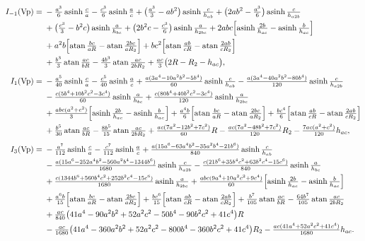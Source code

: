 \documentclass[11pt]{article}
\theoremstyle{remark}
\newcommand{\asinh}{\operatorname{asinh}}
\newcommand{\atan}{\operatorname{atan}}
\begin{document}
{\small
\begin{align}
I_{-1}(\text{Vp}) ={}& -\tfrac{a^3}{6}\asinh\tfrac{c}{a} - \tfrac{c^3}{6}\asinh\tfrac{a}{c}
 + \bigl(\tfrac{a^3}{3} - ab^2\bigr)\asinh\tfrac{c}{h_{ab}}
 + \bigl(2ab^2 - \tfrac{a^3}{6}\bigr)\asinh\tfrac{c}{h_{a2b}}\notag\\
&+ \bigl(\tfrac{c^3}{3} - b^2c\bigr)\asinh\tfrac{a}{h_{bc}}
 + \bigl(2b^2c - \tfrac{c^3}{6}\bigr)\asinh\tfrac{a}{h_{2bc}}
 + 2abc\Bigl[\asinh\tfrac{2b}{h_{ac}} - \asinh\tfrac{b}{h_{ac}}\Bigr]\notag\\
&+ a^2b\Bigl[\atan\tfrac{bc}{aR} - \atan\tfrac{2bc}{aR_2}\Bigr]
 + bc^2\Bigl[\atan\tfrac{ab}{cR} - \atan\tfrac{2ab}{cR_2}\Bigr]\notag\\
&+ \tfrac{b^3}{3}\atan\tfrac{ac}{bR} - \tfrac{4b^3}{3}\atan\tfrac{ac}{2bR_2}
 + \tfrac{ac}{3}\bigl(2R - R_2 - h_{ac}\bigr),
\label{eq:vpm1}\\[4pt]
I_{1}(\text{Vp}) ={}& -\tfrac{a^5}{40}\asinh\tfrac{c}{a} - \tfrac{c^5}{40}\asinh\tfrac{a}{c}
 + \tfrac{a(3a^4-10a^2b^2-5b^4)}{60}\asinh\tfrac{c}{h_{ab}}
 - \tfrac{a(3a^4-40a^2b^2-80b^4)}{120}\asinh\tfrac{c}{h_{a2b}}\notag\\
&- \tfrac{c(5b^4+10b^2c^2-3c^4)}{60}\asinh\tfrac{a}{h_{bc}}
 + \tfrac{c(80b^4+40b^2c^2-3c^4)}{120}\asinh\tfrac{a}{h_{2bc}}\notag\\
&+ \tfrac{abc(a^2+c^2)}{3}\Bigl[\asinh\tfrac{2b}{h_{ac}} - \asinh\tfrac{b}{h_{ac}}\Bigr]
 + \tfrac{a^4b}{6}\Bigl[\atan\tfrac{bc}{aR} - \atan\tfrac{2bc}{aR_2}\Bigr]
 + \tfrac{bc^4}{6}\Bigl[\atan\tfrac{ab}{cR} - \atan\tfrac{2ab}{cR_2}\Bigr]\notag\\
&+ \tfrac{b^5}{30}\atan\tfrac{ac}{bR} - \tfrac{8b^5}{15}\atan\tfrac{ac}{2bR_2}
 + \tfrac{ac(7a^2-12b^2+7c^2)}{60}R - \tfrac{ac(7a^2-48b^2+7c^2)}{120}R_2
 - \tfrac{7ac(a^2+c^2)}{120}h_{ac},\\[4pt]
I_{3}(\text{Vp}) ={}& -\tfrac{a^7}{112}\asinh\tfrac{c}{a} - \tfrac{c^7}{112}\asinh\tfrac{a}{c}
 + \tfrac{a(15a^6-63a^4b^2-35a^2b^4-21b^6)}{840}\asinh\tfrac{c}{h_{ab}}\notag\\
&- \tfrac{a(15a^6-252a^4b^2-560a^2b^4-1344b^6)}{1680}\asinh\tfrac{c}{h_{a2b}}
 - \tfrac{c(21b^6+35b^4c^2+63b^2c^4-15c^6)}{840}\asinh\tfrac{a}{h_{bc}}\notag\\
&+ \tfrac{c(1344b^6+560b^4c^2+252b^2c^4-15c^6)}{1680}\asinh\tfrac{a}{h_{2bc}}
 + \tfrac{abc(9a^4+10a^2c^2+9c^4)}{60}\Bigl[\asinh\tfrac{2b}{h_{ac}} - \asinh\tfrac{b}{h_{ac}}\Bigr]\notag\\
&+ \tfrac{a^6b}{15}\Bigl[\atan\tfrac{bc}{aR} - \atan\tfrac{2bc}{aR_2}\Bigr]
 + \tfrac{bc^6}{15}\Bigl[\atan\tfrac{ab}{cR} - \atan\tfrac{2ab}{cR_2}\Bigr]
 + \tfrac{b^7}{105}\atan\tfrac{ac}{bR} - \tfrac{64b^7}{105}\atan\tfrac{ac}{2bR_2}\notag\\
&+ \tfrac{ac}{840}\bigl(41a^4-90a^2b^2+52a^2c^2-50b^4-90b^2c^2+41c^4\bigr)R\notag\\
&- \tfrac{ac}{1680}\bigl(41a^4-360a^2b^2+52a^2c^2-800b^4-360b^2c^2+41c^4\bigr)R_2
 - \tfrac{ac(41a^4+52a^2c^2+41c^4)}{1680}h_{ac}.
\end{align}}%
\end{document}
